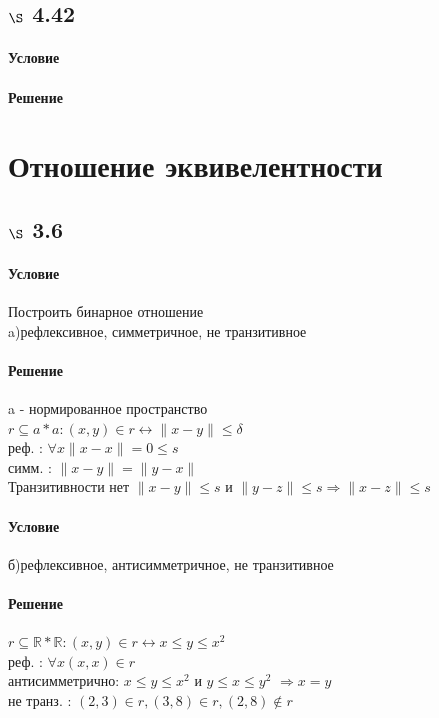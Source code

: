 \documentclass[a4paper,12pt]{article}
\begin{document}
\subsection*{$\S$ 4.42}
\paragraph*{Условие}
\paragraph*{Решение}

\section{Отношение эквивелентности}
\subsection*{$\S$ 3.6}
\paragraph*{Условие}
Построить бинарное отношение\\
a)рефлексивное, симметричное, не транзитивное\\
\paragraph*{Решение}
a - нормированное пространство\\
$ r \subseteq a \ast a : (x,y) \in r \leftrightarrow \parallel x - y \parallel \leq \delta $\\
реф. : $\forall x \parallel x - x \parallel = 0 \leq s $\\
симм. : $\parallel x - y \parallel = \parallel y -x  \parallel $\\
Транзитивности нет $\parallel x - y \parallel \leq s $ и $ \parallel y - z  \parallel \leq s \Rightarrow \parallel x - z \parallel \leq s $\\
\paragraph*{Условие}
б)рефлексивное, антисимметричное, не транзитивное\\
\paragraph*{Решение}
$ r \subseteq \mathbb{R} \ast \mathbb{R} : (x,y) \in r \leftrightarrow x \leq y \leq x^2 $\\
реф. : $\forall x (x,x) \in r$\\
антисимметрично: $ x \leq y \leq x^2 $ и $ y \leq x \leq y^2 $ $\Rightarrow x=y$\\
не транз. : $ (2,3) \in r, (3,8) \in r , (2,8) \not\in r$\\
\end{document}

